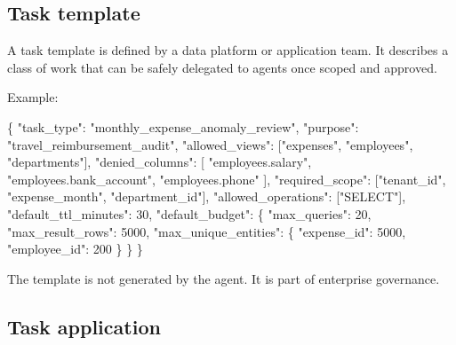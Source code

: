\documentclass[journal]{IEEEtran}
\newenvironment{Shaded}{}{}
\newcommand{\DataTypeTok}[1]{\textcolor[rgb]{0.56,0.13,0.00}{#1}}
\newcommand{\DecValTok}[1]{\textcolor[rgb]{0.25,0.63,0.44}{#1}}
\newcommand{\FunctionTok}[1]{\textcolor[rgb]{0.02,0.16,0.49}{#1}}
\newcommand{\OtherTok}[1]{\textcolor[rgb]{0.00,0.44,0.13}{#1}}
\newcommand{\StringTok}[1]{\textcolor[rgb]{0.25,0.44,0.63}{#1}}
\begin{document}
\hypertarget{task-template}{%
\subsection{Task template}\label{task-template}}

A task template is defined by a data platform or application team. It
describes a class of work that can be safely delegated to agents once
scoped and approved.

Example:

\begin{Shaded}
\begin{Highlighting}[]
\FunctionTok{\{}
  \DataTypeTok{"task\_type"}\FunctionTok{:} \StringTok{"monthly\_expense\_anomaly\_review"}\FunctionTok{,}
  \DataTypeTok{"purpose"}\FunctionTok{:} \StringTok{"travel\_reimbursement\_audit"}\FunctionTok{,}
  \DataTypeTok{"allowed\_views"}\FunctionTok{:} \OtherTok{[}\StringTok{"expenses"}\OtherTok{,} \StringTok{"employees"}\OtherTok{,} \StringTok{"departments"}\OtherTok{]}\FunctionTok{,}
  \DataTypeTok{"denied\_columns"}\FunctionTok{:} \OtherTok{[}
    \StringTok{"employees.salary"}\OtherTok{,}
    \StringTok{"employees.bank\_account"}\OtherTok{,}
    \StringTok{"employees.phone"}
  \OtherTok{]}\FunctionTok{,}
  \DataTypeTok{"required\_scope"}\FunctionTok{:} \OtherTok{[}\StringTok{"tenant\_id"}\OtherTok{,} \StringTok{"expense\_month"}\OtherTok{,} \StringTok{"department\_id"}\OtherTok{]}\FunctionTok{,}
  \DataTypeTok{"allowed\_operations"}\FunctionTok{:} \OtherTok{[}\StringTok{"SELECT"}\OtherTok{]}\FunctionTok{,}
  \DataTypeTok{"default\_ttl\_minutes"}\FunctionTok{:} \DecValTok{30}\FunctionTok{,}
  \DataTypeTok{"default\_budget"}\FunctionTok{:} \FunctionTok{\{}
    \DataTypeTok{"max\_queries"}\FunctionTok{:} \DecValTok{20}\FunctionTok{,}
    \DataTypeTok{"max\_result\_rows"}\FunctionTok{:} \DecValTok{5000}\FunctionTok{,}
    \DataTypeTok{"max\_unique\_entities"}\FunctionTok{:} \FunctionTok{\{}
      \DataTypeTok{"expense\_id"}\FunctionTok{:} \DecValTok{5000}\FunctionTok{,}
      \DataTypeTok{"employee\_id"}\FunctionTok{:} \DecValTok{200}
    \FunctionTok{\}}
  \FunctionTok{\}}
\FunctionTok{\}}
\end{Highlighting}
\end{Shaded}

The template is not generated by the agent. It is part of enterprise
governance.

\hypertarget{task-application}{%
\subsection{Task application}\label{task-application}}
\end{document}
